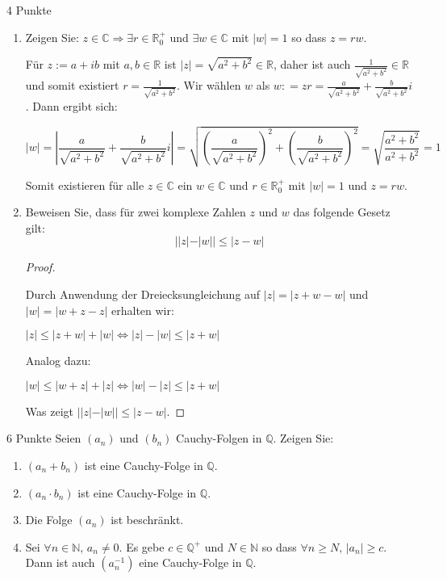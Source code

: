 \documentclass{problemset}
\begin{document}
\begin{problem}{4 Punkte}
\begin{enumerate}
    \item Zeigen Sie: $z \in \mathbb{C} \Rightarrow \exists r \in
          \mathbb{R}^+_0$ und $\exists w \in \mathbb{C}$ mit $|w| = 1$ so dass
          $z = rw$.

          Für $z := a + ib$ mit $a,b \in \mathbb{R}$ ist $|z| = \sqrt{a^2 +
          b^2} \in \mathbb{R}$, daher ist auch $\frac{1}{\sqrt{a^2 + b^2}} \in
          \mathbb{R}$ und somit existiert $r = \frac{1}{\sqrt{a^2 + b^2}}$. Wir
          wählen $w$ als $w : = zr = \frac{a}{\sqrt{a^2 + b^2}} +
          \frac{b}{\sqrt{a^2 + b^2}}i$. Dann ergibt sich:

          \[
              |w| = \left|\frac{a}{\sqrt{a^2 + b^2}} + \frac{b}{\sqrt{a^2 + b^2}}i\right| = \sqrt{\left(\frac{a}{\sqrt{a^2 + b^2}}\right)^2 + \left(\frac{b}{\sqrt{a^2 + b^2}}\right)^2} = \sqrt{\frac{a^2 + b^2}{a^2 + b^2}} = 1
          \]

          Somit existieren für alle $z \in \mathbb{C}$ ein $w \in \mathbb{C}$
          und $r \in \mathbb{R}^+_0$ mit $|w| = 1$ und $z = rw$.

    \item Beweisen Sie, dass für zwei komplexe Zahlen $z$ und $w$ das folgende
          Gesetz gilt:
          \[ ||z| - |w|| \leq |z - w| \]

          \begin{proof}
              $ $

              Durch Anwendung der Dreiecksungleichung auf $|z| = |z+w-w|$ und
              $|w| = |w+z-z|$ erhalten wir:

              $|z| \leq |z+w| + |w| \Leftrightarrow |z| - |w| \leq |z+w|$

              Analog dazu:

              $|w| \leq |w+z| + |z| \Leftrightarrow |w| - |z| \leq |z+w|$

              Was zeigt $||z| - |w|| \leq |z - w|$.
          \end{proof}

\end{enumerate}
\end{problem}

\begin{problem}{6 Punkte}
Seien $(a_n)$ und $(b_n)$ Cauchy-Folgen in $\mathbb{Q}$. Zeigen Sie:
\begin{enumerate}
    \item $(a_n + b_n)$ ist eine Cauchy-Folge in $\mathbb{Q}$.
    \item $(a_n \cdot b_n)$ ist eine Cauchy-Folge in $\mathbb{Q}$.
    \item Die Folge $(a_n)$ ist beschränkt.
    \item Sei $\forall n \in \mathbb{N},\, a_n \neq 0$. Es gebe $c \in
          \mathbb{Q}^+$ und $N \in \mathbb{N}$ so dass $\forall n \geq N,\,
          |a_n| \geq c$. Dann ist auch $(a_n^{-1})$ eine Cauchy-Folge in
          $\mathbb{Q}$.
\end{enumerate}
\end{problem}
\end{document}
